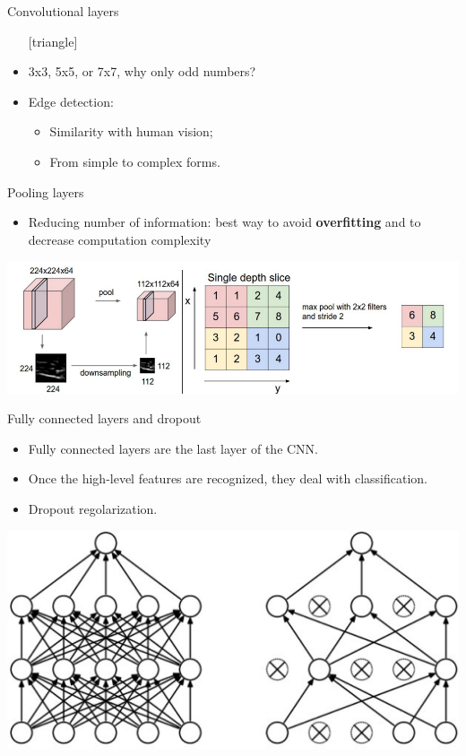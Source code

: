 \documentclass{beamer}
\begin{document}
\begin{frame}{Convolutional layers}
	\begin{itemize}
		\setlength\itemsep{1em}
		[triangle]
		\item 
			3x3, 5x5, or 7x7, why only odd numbers?
		\item 
			Edge detection:
			\begin{itemize}
				[circle]
				\item 
					Similarity with human vision;
				\item 
					From simple to complex forms.
			\end{itemize}
	\end{itemize}
\end{frame}

\begin{frame}{Pooling layers}
	\begin{itemize}
		\setlength\itemsep{1em}
		[triangle]
		\item 
			Reducing number of information: best way to avoid \textbf{overfitting} and to decrease 							computation complexity
	\end{itemize}
	\includegraphics[scale=0.35]{pooling}
\end{frame}

\begin{frame}{Fully connected layers and dropout}
	\begin{itemize}
		\setlength\itemsep{1em}
		[triangle]
		\item 
			Fully connected layers are the last layer of the CNN.
		\item 
			Once the high-level features are recognized, they deal with classification.
		\item
			Dropout regolarization.
	\end{itemize}
	\begin{center}
		\includegraphics[scale=0.35]{dropout}
	\end{center}
\end{frame}
\end{document}
